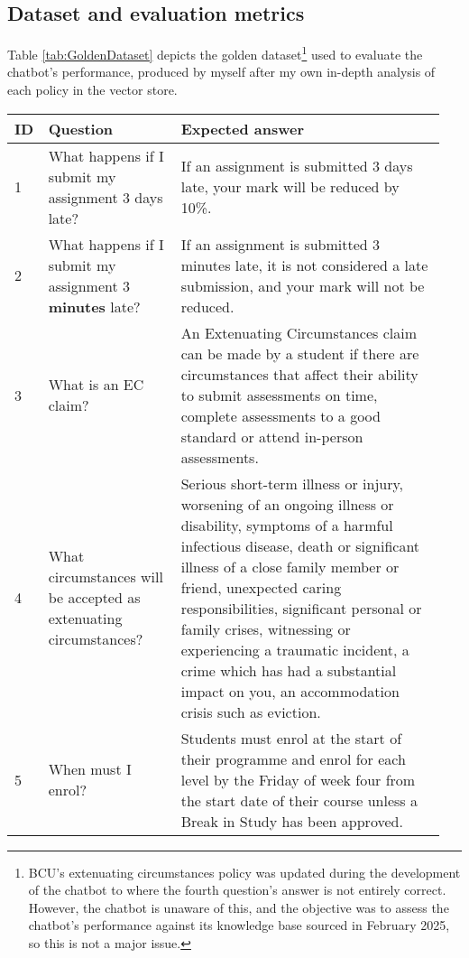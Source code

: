 \subsection{Dataset and evaluation metrics}

\para Table \ref{tab:GoldenDataset} depicts the golden dataset\footnote{BCU's extenuating circumstances policy was updated during the development of the chatbot to where the fourth question's answer is not entirely correct. However, the chatbot is unaware of this, and the objective was to assess the chatbot's performance against its knowledge base sourced in February 2025, so this is not a major issue.} used to evaluate the chatbot's performance, produced by myself after my own in-depth analysis of each policy in the vector store. 

\begin{longtable}{ | p{0.05\linewidth} | p{0.3\linewidth} | p{0.6\linewidth} | }
    \hline
    \cellcolor{blue!25} ID & \cellcolor{blue!25} Question & \cellcolor{blue!25} Expected answer \\
    \hline
    1 & What happens if I submit my assignment 3 days late? &
    If an assignment is submitted 3 days late, your mark will be reduced by 10\%. \\
    \hline
    2 & What happens if I submit my assignment 3 \textbf{minutes} late? &
    If an assignment is submitted 3 minutes late, it is not considered a late submission, and your mark will not be reduced. \\
    \hline 
    3 & What is an EC claim? &
    An Extenuating Circumstances claim can be made by a student if there are circumstances that affect their ability to submit assessments on time, complete assessments to a good standard or attend in-person assessments. \\
    \hline 
    4 & What circumstances will be accepted as extenuating circumstances? &
    Serious short-term illness or injury, worsening of an ongoing illness or disability, symptoms of a harmful infectious disease, death or significant illness of a close family member or friend, unexpected caring responsibilities, significant personal or family crises, witnessing or experiencing a traumatic incident, a crime which has had a substantial impact on you, an accommodation crisis such as eviction.\\
    \hline 
    5 & When must I enrol? & 
    Students must enrol at the start of their programme and enrol for each level by the Friday of week four from the start date of their course unless a Break in Study has been approved. \\

\end{longtable}
